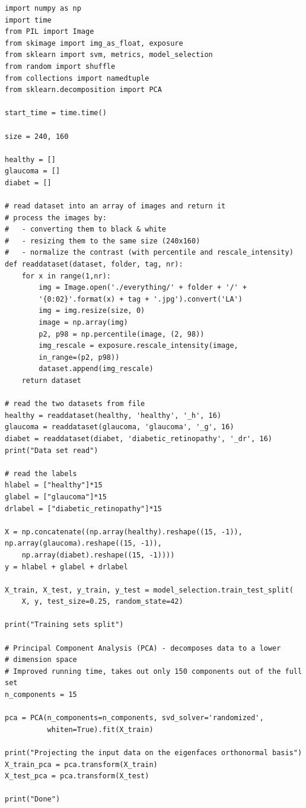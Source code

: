 \documentclass[a4paper,10pt]{article}
\begin{document}
  \begin{lstlisting}
import numpy as np
import time
from PIL import Image
from skimage import img_as_float, exposure
from sklearn import svm, metrics, model_selection
from random import shuffle
from collections import namedtuple
from sklearn.decomposition import PCA

start_time = time.time()

size = 240, 160

healthy = []
glaucoma = []
diabet = []

# read dataset into an array of images and return it
# process the images by:
# 	- converting them to black & white
# 	- resizing them to the same size (240x160)
# 	- normalize the contrast (with percentile and rescale_intensity) 
def readdataset(dataset, folder, tag, nr):
	for x in range(1,nr):
		img = Image.open('./everything/' + folder + '/' + 
		'{0:02}'.format(x) + tag + '.jpg').convert('LA')
		img = img.resize(size, 0)
		image = np.array(img)
		p2, p98 = np.percentile(image, (2, 98))
		img_rescale = exposure.rescale_intensity(image,
		in_range=(p2, p98))
		dataset.append(img_rescale)
	return dataset

# read the two datasets from file
healthy = readdataset(healthy, 'healthy', '_h', 16)
glaucoma = readdataset(glaucoma, 'glaucoma', '_g', 16)
diabet = readdataset(diabet, 'diabetic_retinopathy', '_dr', 16)
print("Data set read")

# read the labels
hlabel = ["healthy"]*15
glabel = ["glaucoma"]*15
drlabel = ["diabetic_retinopathy"]*15

X = np.concatenate((np.array(healthy).reshape((15, -1)),
np.array(glaucoma).reshape((15, -1)),
	np.array(diabet).reshape((15, -1))))
y = hlabel + glabel + drlabel

X_train, X_test, y_train, y_test = model_selection.train_test_split(
    X, y, test_size=0.25, random_state=42)

print("Training sets split")

# Principal Component Analysis (PCA) - decomposes data to a lower  
# dimension space
# Improved running time, takes out only 150 components out of the full set
n_components = 15

pca = PCA(n_components=n_components, svd_solver='randomized',
          whiten=True).fit(X_train)

print("Projecting the input data on the eigenfaces orthonormal basis")
X_train_pca = pca.transform(X_train)
X_test_pca = pca.transform(X_test)

print("Done")


\end{lstlisting}
\end{document}
